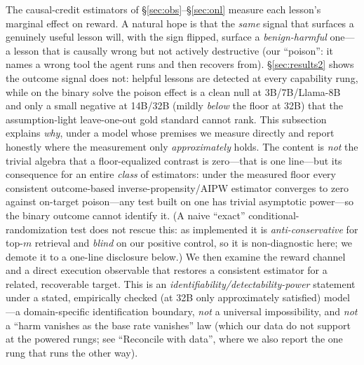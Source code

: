 The causal-credit estimators of \S\ref{sec:obs}--\S\ref{sec:onl} measure each
lesson's marginal effect on reward. A natural hope is that the \emph{same} signal
that surfaces a genuinely useful lesson will, with the sign flipped, surface a
\emph{benign-harmful} one---a lesson that is causally wrong but not actively
destructive (our ``poison'': it names a wrong tool the agent runs and then recovers
from). \S\ref{sec:results2} shows the outcome signal does not: helpful lessons are
detected at every capability rung, while on the binary solve the poison effect is a
clean null at 3B/7B/Llama-8B and only a small negative at 14B/32B (mildly \emph{below}
the floor at 32B) that the assumption-light leave-one-out gold standard cannot rank.
This subsection explains \emph{why}, under a model whose premises we measure directly
and report honestly where the measurement only \emph{approximately} holds. The content
is \emph{not} the trivial algebra that a floor-equalized contrast is zero---that is one
line---but its consequence for an entire \emph{class} of estimators: under the measured
floor every consistent outcome-based inverse-propensity/AIPW estimator converges to zero
against on-target poison---any test built on one has trivial asymptotic power---so the
binary outcome cannot identify it. (A naive ``exact''
conditional-randomization test does not rescue this: as implemented it is
\emph{anti-conservative} for top-$m$ retrieval and \emph{blind} on our positive control,
so it is non-diagnostic here; we demote it to a one-line disclosure below.) We then
examine the reward channel and a direct execution observable that restores a consistent
estimator for a related, recoverable target. This is an
\emph{identifiability/detectability-power} statement under a stated, empirically checked
(at 32B only approximately satisfied) model---a domain-specific identification boundary,
\emph{not} a universal impossibility, and \emph{not} a ``harm vanishes as the base rate
vanishes'' law (which our data do not support at the powered rungs; see ``Reconcile with
data'', where we also report the one rung that runs the other way).


